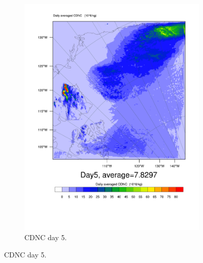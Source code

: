 \begin{figure}
\begin{subfigure}{0.40\textwidth}
		\includegraphics[width=\textwidth]{results/control/QNCLOUD_day5.pdf}
		\caption{CDNC day 5.}
		\label{subfig:cdnc_cont_Day5}
	\end{subfigure}
	

\end{figure}
